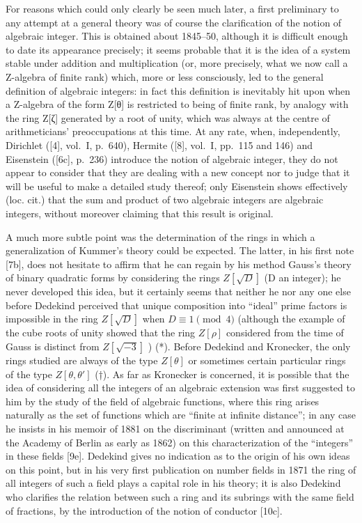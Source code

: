 For reasons which could only clearly be seen much later, a first preliminary to any attempt at a general theory was of course the clarification of the notion of algebraic integer. This is obtained about 1845--50, although it is difficult enough to date its appearance precisely; it seems probable that it is the idea of a system stable under addition and multiplication (or, more precisely, what we now call a Z-algebra of finite rank) which, more or less consciously, led to the general definition of algebraic integers: in fact this definition is inevitably hit upon when a Z-algebra of the form Z{[}θ{]} is restricted to being of finite rank, by analogy with the ring Z{[}ζ{]} generated by a root of unity, which was always at the centre of arithmeticians' preoccupations at this time. At any rate, when, independently, Dirichlet ({[}4{]}, vol.~I, p.~640), Hermite ({[}8{]}, vol.~I, pp.~115 and 146) and Eisenstein ({[}6c{]}, p.~236) introduce the notion of algebraic integer, they do not appear to consider that they are dealing with a new concept nor to judge that it will be useful to make a detailed study thereof; only Eisenstein shows effectively (loc. cit.) that the sum and product of two algebraic integers are algebraic integers, without moreover claiming that this result is original.

A much more subtle point was the determination of the rings in which a generalization of Kummer's theory could be expected. The latter, in his first note {[}7b{]}, does not hesitate to affirm that he can regain by his method Gauss's theory of binary quadratic forms by considering the rings \(Z[\sqrt{D}]\) (D an integer); he never developed this idea, but it certainly seems that neither he nor any one else before Dedekind perceived that unique composition into ``ideal'' prime factors is impossible in the ring \(Z[\sqrt{D}]\) when \(D \equiv 1 \pmod{4}\) (although the example of the cube roots of unity showed that the ring \(Z[\rho]\) considered from the time of Gauss is distinct from \(Z[\sqrt{-3}]\) ) (*). Before Dedekind and Kronecker, the only rings studied are always of the type \(Z[\theta]\) or sometimes certain particular rings of the type \(Z[\theta, \theta']\) (†). As far as Kronecker is concerned, it is possible that the idea of considering all the integers of an algebraic extension was first suggested to him by the study of the field of algebraic functions, where this ring arises naturally as the set of functions which are ``finite at infinite distance''; in any case he insists in his memoir of 1881 on the discriminant (written and announced at the Academy of Berlin as early as 1862) on this characterization of the ``integers'' in these fields {[}9e{]}. Dedekind gives no indication as to the origin of his own ideas on this point, but in his very first publication on number fields in 1871 the ring of all integers of such a field plays a capital role in his theory; it is also Dedekind who clarifies the relation between such a ring and its subrings with the same field of fractions, by the introduction of the notion of conductor {[}10c{]}.

